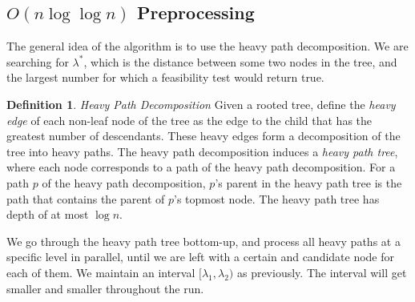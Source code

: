 \documentclass[11pt,a4paper]{article}
\theoremstyle{definition}
\newtheorem{definition}{Definition}
\theoremstyle{remark}
\begin{document}
\subsection{\boldmath$O(n\log\log n)$ Preprocessing} 
The general idea of the algorithm is to use the heavy path decomposition. We are searching for $\lambda^*$, which is the distance between some two nodes in the tree, and the largest number for which a feasibility test would return true.
\begin{definition}
\emph{Heavy Path Decomposition} \cite{Sleator1983} Given a rooted tree, define the \emph{heavy edge} of each non-leaf node of the tree as the edge to the child that has the greatest number of descendants. These heavy edges form a decomposition of the tree into heavy paths. The heavy path decomposition induces a \emph{heavy path tree}, where each node corresponds to a path of the heavy path decomposition. For a path $p$ of the heavy path decomposition, $p$'s parent in the heavy path tree is the path that contains the parent of $p$'s topmost node. The heavy path tree has depth of at most $\log n$. %
\end{definition}
We go through the heavy path tree bottom-up, and process all heavy paths at a specific level in parallel, until we are left with a certain and candidate node for each of them. We maintain an interval $[\lambda_1,\lambda_2)$ as previously. The interval will get smaller and smaller throughout the run.
\end{document}
